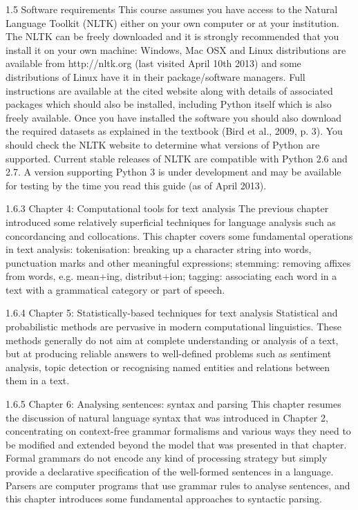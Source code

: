 1.5 Software requirements
This course assumes you have access to the Natural Language Toolkit (NLTK) either
on your own computer or at your institution. The NLTK can be freely downloaded
and it is strongly recommended that you install it on your own machine: Windows,
Mac OSX and Linux distributions are available from http://nltk.org (last visited
April 10th 2013) and some distributions of Linux have it in their package/software
managers. Full instructions are available at the cited website along with details of
associated packages which should also be installed, including Python itself which is
also freely available. Once you have installed the software you should also download
the required datasets as explained in the textbook (Bird et al., 2009, p. 3).
You should check the NLTK website to determine what versions of Python are
supported. Current stable releases of NLTK are compatible with Python 2.6 and 2.7.
A version supporting Python 3 is under development and may be available for
testing by the time you read this guide (as of April 2013).


1.6.3 Chapter 4: Computational tools for text analysis
The previous chapter introduced some relatively superficial techniques for language
analysis such as concordancing and collocations. This chapter covers some
fundamental operations in text analysis:
tokenisation: breaking up a character string into words, punctuation marks and
other meaningful expressions;
stemming: removing affixes from words, e.g. mean+ing, distribut+ion;
tagging: associating each word in a text with a grammatical category or part of
speech.

1.6.4 Chapter 5: Statistically-based techniques for text analysis
Statistical and probabilistic methods are pervasive in modern computational
linguistics. These methods generally do not aim at complete understanding or
analysis of a text, but at producing reliable answers to well-defined problems such as
sentiment analysis, topic detection or recognising named entities and relations
between them in a text.

1.6.5 Chapter 6: Analysing sentences: syntax and parsing
This chapter resumes the discussion of natural language syntax that was introduced
in Chapter 2, concentrating on context-free grammar formalisms and various ways
they need to be modified and extended beyond the model that was presented in that
chapter. Formal grammars do not encode any kind of processing strategy but simply
provide a declarative specification of the well-formed sentences in a language.
Parsers are computer programs that use grammar rules to analyse sentences, and
this chapter introduces some fundamental approaches to syntactic parsing.

